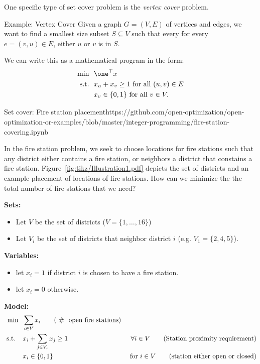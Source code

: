 One specific type of set cover problem is the \emph{vertex cover} problem.
\begin{general}{Example: Vertex Cover}{\npcomplete}
\label{ex:vertex-cover}
Given a graph $G = (V,E)$ of vertices and edges, we want to find a smallest size subset $S \subseteq V$ such that every for every $e = (v,u) \in E$, either $u$ or $v$ is in $S$.   

We can write this as a mathematical program in the form:
\begin{equation}
\begin{split}
\min \ \ & \one^\top x\\
\text{s.t.} \ \ & x_u + x_v \geq 1 \text{ for all } (u,v) \in E \\ 
& x_v \in \{0,1\} \text{ for all } v \in V.
\end{split}
\end{equation}
\end{general}




\begin{examplewithcode}{Set cover: Fire station placement}{https://github.com/open-optimization/open-optimization-or-examples/blob/master/integer-programming/fire-station-covering.ipynb}
\label{example:fire-station}

In the fire station problem, we seek to choose locations for fire stations such that any district either contains a fire station, or neighbors a district that constains a fire station.  Figure~\ref{fig:tikz/Illustration1.pdf} depicts the set of districts and an example placement of locations of fire stations.  How can we minimize the the total number of fire stations that we need?


\noindent \textbf{Sets:}
\begin{itemize}
\item Let $V$ be the set of districts ($V = \{1, \dots, 16\}$)
\item Let $V_i$ be the set of districts that neighbor district $i$ (e.g. $V_1 = \{2,4,5\}$).
\end{itemize}

\noindent \textbf{Variables:}
\begin{itemize}
\item let $x_i = 1$ if district $i$ is chosen to have a fire station.
\item let $x_i = 0$ otherwise.
\end{itemize}
\textbf{Model:}
\begin{align}
\min  \  \ &\sum_{i \in V} x_i \tag{ \# \text{ open fire stations}}\\
\text{ s.t. }\ \ &  x_i + \sum_{j \in V_i} x_j \geq 1 & \forall{i \in V} \tag{Station proximity requirement}\\
& x_i \in \{0,1\} & \text{ for } i\in V  \tag{station either open or closed}
\end{align}
\end{examplewithcode}

